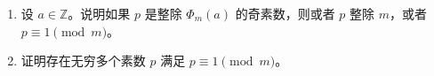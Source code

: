 \begin{enumerate}[label=\arabic*.]
	 \item 设 $a\in\mathbb Z$。说明如果 $p$ 是整除 $\Phi_m(a)$ 的奇素数，则或者 $p$ 整除 $m$，或者 $p\equiv1\pmod m$。
	 
	 \item 证明存在无穷多个素数 $p$ 满足 $p\equiv1\pmod m$。
	 
\end{enumerate}
	
